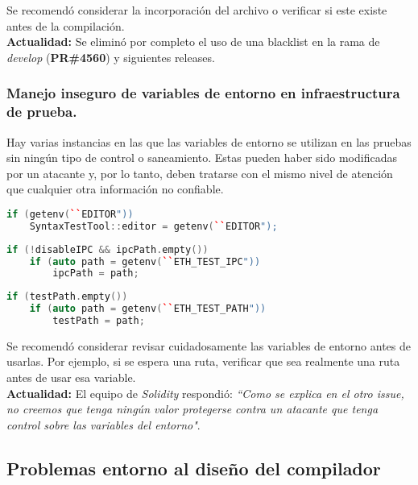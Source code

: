 Se recomendó considerar la incorporación del archivo o verificar si este existe antes de la compilación.\\

\textbf{Actualidad:} Se eliminó por completo el uso de una blacklist en la rama de \textit{develop} (\textbf{PR\#4560}\cite{GHPR4560}) y siguientes releases.\\

\subsubsection{Manejo inseguro de variables de entorno en infraestructura de prueba.}

Hay varias instancias en las que las variables de entorno se utilizan en las pruebas sin ningún tipo de control o saneamiento. Estas pueden haber sido modificadas por un atacante y, por lo tanto, deben tratarse con el mismo nivel de atención que cualquier otra información no confiable.\\

\begin{lstlisting}[language=c++, caption={\texttt{/test/tools/isoltest.cpp:312}}]
if (getenv(``EDITOR"))
    SyntaxTestTool::editor = getenv(``EDITOR");
\end{lstlisting}

\begin{lstlisting}[language=c++, caption={\texttt{/test/Options.cpp:67}}]
if (!disableIPC && ipcPath.empty())
    if (auto path = getenv(``ETH_TEST_IPC"))
        ipcPath = path;
\end{lstlisting}

\begin{lstlisting}[language=c++, caption={\texttt{/test/Options.cpp:70}}]
if (testPath.empty())
    if (auto path = getenv(``ETH_TEST_PATH"))
        testPath = path;
\end{lstlisting}

Se recomendó considerar revisar cuidadosamente las variables de entorno antes de usarlas. Por ejemplo, si se espera una ruta, verificar que sea realmente una ruta antes de usar esa variable.\\

\textbf{Actualidad:} El equipo de \textit{Solidity} respondió: \textit{``Como se explica en el otro issue, no creemos que tenga ningún valor protegerse contra un atacante que tenga control sobre las variables del entorno"}.\\

\subsection{Problemas entorno al diseño del compilador}

